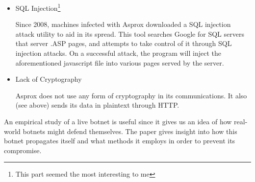 \documentclass{article}
\begin{document}
\begin{enumerate}
\begin{itemize}
			\item SQL Injection\footnote{This part seemed the most interesting to me}
			
			Since 2008, machines infected with Asprox downloaded a SQL injection attack utility to aid in its spread. This tool searches Google for SQL servers that server .ASP pages, and attempts to take control of it through SQL injection attacks. On a successful attack, the program will inject the aforementioned javascript file into various pages served by the server.
			
			\item Lack of Cryptography
			
			Asprox does not use any form of cryptography in its communications. It also (see above) sends its data in plaintext through HTTP.
		\end{itemize}
		
		An empirical study of a live botnet is useful since it gives us an idea of how real-world botnets might defend themselves. The paper gives insight into how this botnet propagates itself and what methods it employs in order to prevent its compromise.
	\end{enumerate}
	\printbibliography
\end{document}

